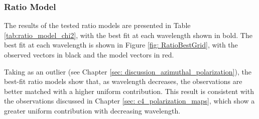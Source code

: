 \subsubsection{Ratio Model}
The results of the tested ratio models are presented in Table \ref{tab:ratio_model_chi2}, with the best fit at each wavelength shown in bold. The best fit at each wavelength is shown in Figure \ref{fig: RatioBestGrid}, with the observed vectors in black and the model vectors in red.  

Taking \bfive as an outlier (see Chapter \ref{sec: discussion_azimuthal_polarization}), the best-fit ratio models show that, as wavelength decreases, the observations are better matched with a higher uniform contribution. This result is consistent with the observations discussed in Chapter \ref{sec: c4_polarization_maps}, which show a greater uniform contribution with decreasing wavelength. 






